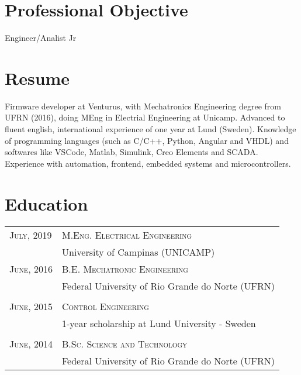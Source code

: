 \documentclass[a4paper,10pt]{article}
\newcommand\tab[1][1cm]{\hspace*{#1}}
\begin{document}
\begin{flushleft}

\section{Professional Objective}

\tab Engineer/Analist Jr

\section{Resume}

\tab Firmware developer at Venturus, with Mechatronics Engineering degree from UFRN (2016), doing MEng in Electrial Engineering at Unicamp. Advanced to fluent english, international experience of one year at Lund (Sweden). Knowledge of programming languages (such as C/C++, Python, Angular and VHDL) and softwares like VSCode, Matlab, Simulink, Creo Elements and SCADA. Experience with automation, frontend, embedded systems and microcontrollers. 


\section{Education}
\begin{tabular}{R{3cm}l}	
 \textsc{July, 2019} & \textsc{M.Eng. Electrical Engineering}\\ & University of Campinas (UNICAMP) &\\
\textsc{June, 2016} & \textsc{B.E. Mechatronic Engineering} \\& Federal University of Rio Grande do Norte (UFRN) \\&\\
\textsc{June, 2015} & \textsc{Control Engineering} \\ & 1-year scholarship at Lund University - Sweden  \\&\\
\textsc{June, 2014} &  \textsc{B.Sc. Science and Technology}\\
& Federal University of Rio Grande do Norte (UFRN)
\end{tabular}


\end{flushleft}
\end{document}
